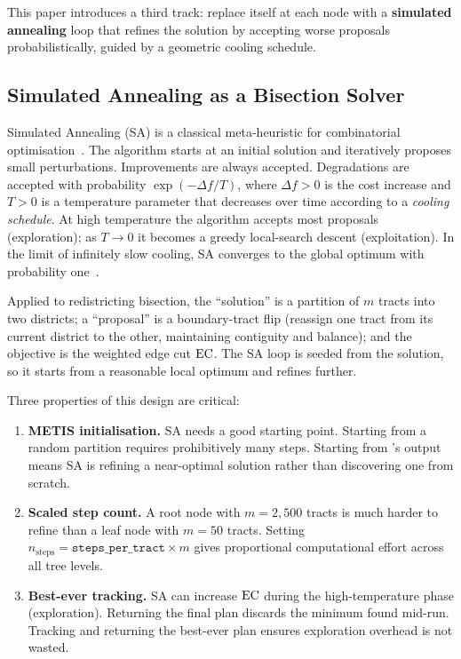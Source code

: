 This paper introduces a third track: replace \metis{} itself at each node
with a \textbf{simulated annealing} loop that refines the \metis{} solution
by accepting worse proposals probabilistically, guided by a geometric
cooling schedule.

\subsection{Simulated Annealing as a Bisection Solver}

Simulated Annealing (SA) is a classical meta-heuristic for combinatorial
optimisation~\citep{kirkpatrick1983}.
The algorithm starts at an initial solution and iteratively proposes
small perturbations.
Improvements are always accepted.
Degradations are accepted with probability $\exp(-\Delta f / T)$, where
$\Delta f > 0$ is the cost increase and $T > 0$ is a temperature parameter
that decreases over time according to a \emph{cooling schedule}.
At high temperature the algorithm accepts most proposals (exploration);
as $T \to 0$ it becomes a greedy local-search descent (exploitation).
In the limit of infinitely slow cooling, SA converges to the global
optimum with probability one~\citep{kirkpatrick1983}.

Applied to redistricting bisection, the ``solution'' is a partition of $m$
tracts into two districts; a ``proposal'' is a boundary-tract flip
(reassign one tract from its current district to the other, maintaining
contiguity and balance); and the objective is the weighted edge cut $\mathrm{EC}$.
The SA loop is seeded from the \metis{} solution, so it starts from a
reasonable local optimum and refines further.

Three properties of this design are critical:

\begin{enumerate}
\item \textbf{METIS initialisation.}
  SA needs a good starting point.
  Starting from a random partition requires prohibitively many steps.
  Starting from \metis{}'s output means SA is refining a near-optimal
  solution rather than discovering one from scratch.

\item \textbf{Scaled step count.}
  A root node with $m = 2{,}500$ tracts is much harder to refine than a
  leaf node with $m = 50$ tracts.
  Setting $n_{\mathrm{steps}} = \texttt{steps\_per\_tract} \times m$ gives
  proportional computational effort across all tree levels.

\item \textbf{Best-ever tracking.}
  SA can increase $\mathrm{EC}$ during the high-temperature phase (exploration).
  Returning the final plan discards the minimum found mid-run.
  Tracking and returning the best-ever plan ensures exploration overhead
  is not wasted.
\end{enumerate}

